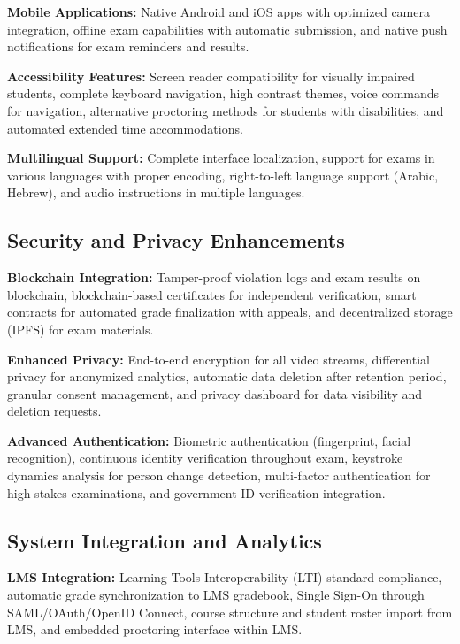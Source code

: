 \textbf{Mobile Applications:} Native Android and iOS apps with optimized camera integration, offline exam capabilities with automatic submission, and native push notifications for exam reminders and results.

\textbf{Accessibility Features:} Screen reader compatibility for visually impaired students, complete keyboard navigation, high contrast themes, voice commands for navigation, alternative proctoring methods for students with disabilities, and automated extended time accommodations.

\textbf{Multilingual Support:} Complete interface localization, support for exams in various languages with proper encoding, right-to-left language support (Arabic, Hebrew), and audio instructions in multiple languages.

\subsection{Security and Privacy Enhancements}

\textbf{Blockchain Integration:} Tamper-proof violation logs and exam results on blockchain, blockchain-based certificates for independent verification, smart contracts for automated grade finalization with appeals, and decentralized storage (IPFS) for exam materials.

\textbf{Enhanced Privacy:} End-to-end encryption for all video streams, differential privacy for anonymized analytics, automatic data deletion after retention period, granular consent management, and privacy dashboard for data visibility and deletion requests.

\textbf{Advanced Authentication:} Biometric authentication (fingerprint, facial recognition), continuous identity verification throughout exam, keystroke dynamics analysis for person change detection, multi-factor authentication for high-stakes examinations, and government ID verification integration.

\subsection{System Integration and Analytics}

\textbf{LMS Integration:} Learning Tools Interoperability (LTI) standard compliance, automatic grade synchronization to LMS gradebook, Single Sign-On through SAML/OAuth/OpenID Connect, course structure and student roster import from LMS, and embedded proctoring interface within LMS.

